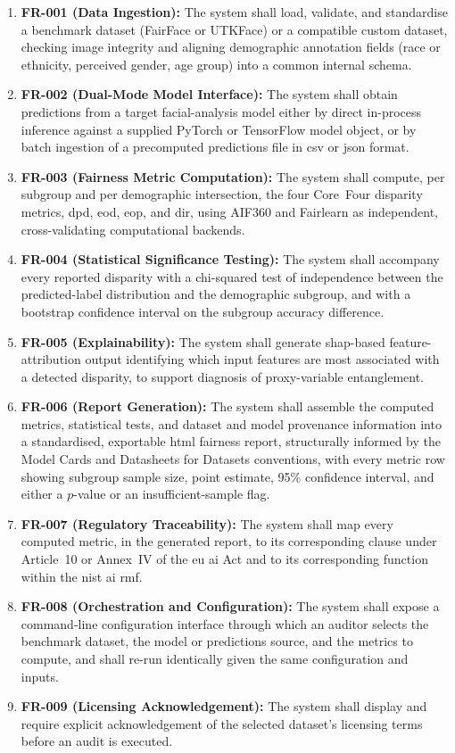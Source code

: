 \begin{enumerate}
    \item \textbf{FR-001 (Data Ingestion):} The system shall load, validate, and standardise a benchmark dataset (FairFace or UTKFace) or a compatible custom dataset, checking image integrity and aligning demographic annotation fields (race or ethnicity, perceived gender, age group) into a common internal schema.
    \item \textbf{FR-002 (Dual-Mode Model Interface):} The system shall obtain predictions from a target facial-analysis model either by direct in-process inference against a supplied PyTorch or TensorFlow model object, or by batch ingestion of a precomputed predictions file in \gls{csv} or \gls{json} format.
    \item \textbf{FR-003 (Fairness Metric Computation):} The system shall compute, per subgroup and per demographic intersection, the four Core~Four disparity metrics, \gls{dpd}, \gls{eod}, \gls{eop}, and \gls{dir}, using AIF360 and Fairlearn as independent, cross-validating computational backends.
    \item \textbf{FR-004 (Statistical Significance Testing):} The system shall accompany every reported disparity with a chi-squared test of independence between the predicted-label distribution and the demographic subgroup, and with a bootstrap confidence interval on the subgroup accuracy difference.
    \item \textbf{FR-005 (Explainability):} The system shall generate \gls{shap}-based feature-attribution output identifying which input features are most associated with a detected disparity, to support diagnosis of proxy-variable entanglement.
    \item \textbf{FR-006 (Report Generation):} The system shall assemble the computed metrics, statistical tests, and dataset and model provenance information into a standardised, exportable \gls{html} fairness report, structurally informed by the Model Cards and Datasheets for Datasets conventions, with every metric row showing subgroup sample size, point estimate, 95\% confidence interval, and either a $p$-value or an insufficient-sample flag.
    \item \textbf{FR-007 (Regulatory Traceability):} The system shall map every computed metric, in the generated report, to its corresponding clause under Article~10 or Annex~IV of the \gls{eu} \gls{ai} Act and to its corresponding function within the \gls{nist} \gls{ai} \gls{rmf}.
    \item \textbf{FR-008 (Orchestration and Configuration):} The system shall expose a command-line configuration interface through which an auditor selects the benchmark dataset, the model or predictions source, and the metrics to compute, and shall re-run identically given the same configuration and inputs.
    \item \textbf{FR-009 (Licensing Acknowledgement):} The system shall display and require explicit acknowledgement of the selected dataset's licensing terms before an audit is executed.
\end{enumerate}

